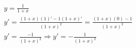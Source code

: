 \begin{ex}
\begin{align}
&y=\frac{1}{1+x}\nonumber\\
&y'=\frac{(1+x)(1)'-1(1+x)'}{(1+x)^2}=\frac{(1+x)(0)-1}{(1+x)^2}\nonumber\\
&y'=\frac{-1}{(1+x)^2}\Rightarrow y'=-\frac{1}{(1+x)^2}\nonumber
\end{align}
\end{ex}